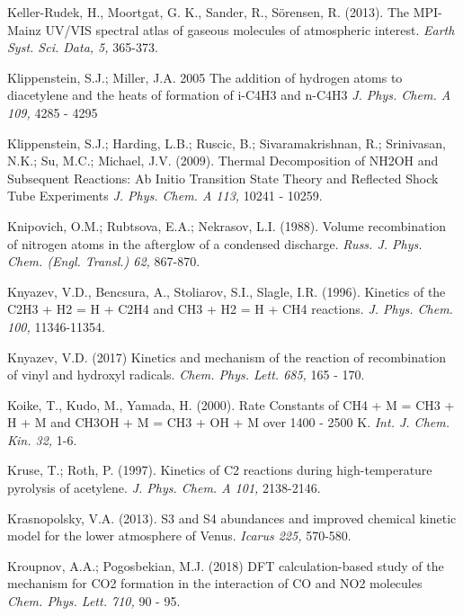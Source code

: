 \documentclass[12pt,landscape]{article}
\newcounter{reaction}
\begin{document}
Keller-Rudek, H., Moortgat, G. K., Sander, R., S{\"o}rensen, R. (2013).
 The MPI-Mainz UV/VIS spectral atlas of gaseous molecules of atmospheric interest.
 {\em Earth Syst. Sci. Data, 5,} 365-373.
 
Klippenstein, S.J.; Miller, J.A. 2005  The addition of hydrogen atoms to diacetylene and the heats of formation of i-C4H3 and n-C4H3
{\em  J. Phys. Chem. A 109,}  4285 - 4295

Klippenstein, S.J.; Harding, L.B.; Ruscic, B.; Sivaramakrishnan, R.; Srinivasan, N.K.; Su, M.C.; Michael, J.V. (2009).
Thermal Decomposition of NH2OH and Subsequent Reactions: Ab Initio Transition State Theory and Reflected Shock Tube Experiments
{\em J. Phys. Chem. A 113,} 10241 - 10259.

Knipovich, O.M.; Rubtsova, E.A.; Nekrasov, L.I. (1988).   Volume recombination of nitrogen atoms in the afterglow of a condensed discharge. {\em Russ. J. Phys. Chem. (Engl. Transl.) 62,} 867-870.

Knyazev, V.D., Bencsura, A., Stoliarov, S.I., Slagle, I.R. (1996).  Kinetics of the C2H3 + H2 = H + C2H4 and CH3 + H2 = H + CH4 reactions. {\em J. Phys. Chem. 100,} 11346-11354.

Knyazev, V.D. (2017)  Kinetics and mechanism of the reaction of recombination of vinyl and hydroxyl radicals.
{\em Chem. Phys. Lett. 685,} 165 - 170.

Koike, T., Kudo, M., Yamada, H. (2000). Rate Constants of CH4 + M = CH3 + H + M and CH3OH + M = CH3 + OH + M over 1400 - 2500 K.  {\em Int. J. Chem. Kin. 32,} 1-6.


Kruse, T.; Roth, P. (1997). Kinetics of C2 reactions during high-temperature pyrolysis of acetylene. {\em J. Phys. Chem. A 101,}  2138-2146.

Krasnopolsky, V.A. (2013).
S3 and S4 abundances and improved chemical kinetic model for the lower atmosphere of Venus.
{\em Icarus 225,} 570-580.

Kroupnov, A.A.; Pogosbekian, M.J. (2018)
DFT calculation-based study of the mechanism for CO2 formation in the interaction of CO and NO2 molecules
{\em Chem. Phys. Lett. 710,} 90 - 95.
\end{document}
